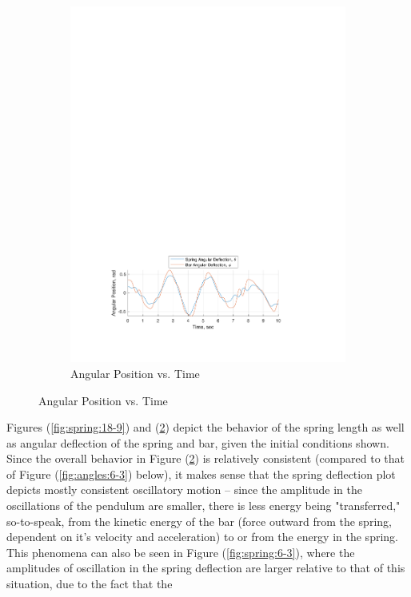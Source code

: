 \documentclass[12pt]{report}
\begin{document}
\begin{flushleft}
\begin{figure}[!ht]
\begin{subfigure}[t]{\textwidth}
  \includegraphics[center]{angles_18-9}
  \caption{Angular Position vs. Time}
  \label{fig:angles:18-9}
\end{subfigure}
\end{figure}
Figures (\ref{fig:spring:18-9}) and (\ref{fig:angles:18-9}) depict the behavior of the spring length as
well as angular deflection of the spring and bar, given the initial conditions shown.
Since the overall behavior in Figure (\ref{fig:angles:18-9}) is relatively consistent
(compared to that of Figure (\ref{fig:angles:6-3}) below), it makes sense that the spring
deflection plot depicts mostly consistent oscillatory motion -- since the amplitude in the
oscillations of the pendulum are smaller, there is less energy being "transferred," so-to-speak,
from the kinetic energy of the bar (force outward from the spring, dependent on it's velocity and acceleration)
to or from the energy in the spring. This phenomena can also be seen in Figure (\ref{fig:spring:6-3}), where the amplitudes
of oscillation in the spring deflection are larger relative to that of this situation, due to the fact that the

\end{flushleft}
\end{document}

